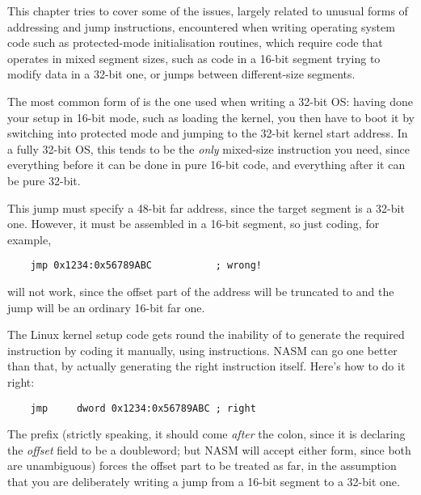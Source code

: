 %
%

This chapter tries to cover some of the issues, largely related to
unusual forms of addressing and jump instructions, encountered when
writing operating system code such as protected-mode initialisation
routines, which require code that operates in mixed segment sizes,
such as code in a 16-bit segment trying to modify data in a 32-bit
one, or jumps between different-size segments.


The most common form of  is the one
used when writing a 32-bit OS: having done your setup in 16-bit mode,
such as loading the kernel, you then have to boot it by switching into
protected mode and jumping to the 32-bit kernel start address. In a
fully 32-bit OS, this tends to be the \emph{only} mixed-size
instruction you need, since everything before it can be done in pure
16-bit code, and everything after it can be pure 32-bit.

This jump must specify a 48-bit far address, since the target
segment is a 32-bit one. However, it must be assembled in a 16-bit
segment, so just coding, for example,

\begin{lstlisting}
    jmp 0x1234:0x56789ABC           ; wrong!
\end{lstlisting}

will not work, since the offset part of the address will be
truncated to  and the jump will be an ordinary 16-bit far
one.

The Linux kernel setup code gets round the inability of  to
generate the required instruction by coding it manually, using
 instructions. NASM can go one better than that, by actually
generating the right instruction itself. Here's how to do it right:

\begin{lstlisting}
    jmp     dword 0x1234:0x56789ABC ; right
\end{lstlisting}

The  prefix (strictly speaking,
it should come \emph{after} the colon, since it is declaring the
\emph{offset} field to be a doubleword; but NASM will accept either
form, since both are unambiguous) forces the offset part to be treated
as far, in the assumption that you are deliberately writing a jump from
a 16-bit segment to a 32-bit one.

